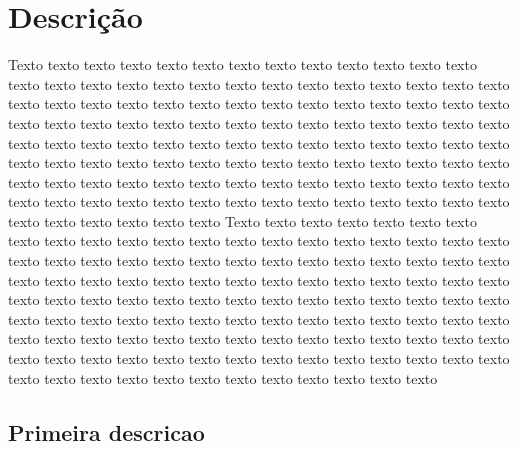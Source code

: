 \chapter{Descrição}
\label{cap:descricao}

Texto texto texto texto texto texto texto texto texto texto texto texto texto
texto texto texto texto texto texto texto texto texto texto texto texto texto
texto texto texto texto texto texto texto texto texto texto texto texto texto
texto texto texto texto texto texto texto texto texto texto texto texto texto
texto texto texto texto texto texto texto texto texto texto texto texto texto 
texto texto texto texto texto texto texto texto texto texto texto texto texto 
texto texto texto texto texto texto texto texto texto texto texto texto texto 
texto texto texto texto texto texto texto texto texto texto texto texto texto 
texto texto texto texto texto texto texto texto texto texto texto texto texto
Texto texto texto texto texto texto texto texto texto texto texto texto texto
texto texto texto texto texto texto texto texto texto texto texto texto texto
texto texto texto texto texto texto texto texto texto texto texto texto texto
texto texto texto texto texto texto texto texto texto texto texto texto texto
texto texto texto texto texto texto texto texto texto texto texto texto texto 
texto texto texto texto texto texto texto texto texto texto texto texto texto 
texto texto texto texto texto texto texto texto texto texto texto texto texto 
texto texto texto texto texto texto texto texto texto texto texto texto texto 
texto texto texto texto texto texto texto texto texto texto texto texto texto

\section{Primeira descricao}
\label{sec:descricao_um}

